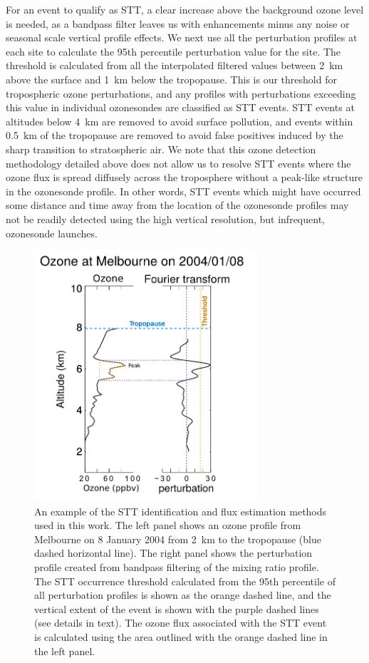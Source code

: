 \documentclass[acp, manuscript]{copernicus} %
\begin{document}
    For an event to qualify as STT, a clear increase above the background ozone level is needed, as a bandpass filter leaves us with enhancements minus any noise or seasonal scale vertical profile effects.
    We next use all the perturbation profiles at each site to calculate the 95th percentile perturbation value for the site.
    The threshold is calculated from all the interpolated filtered values between 2~km above the surface and 1~km below the tropopause.
    This is our threshold for tropospheric ozone perturbations, and any profiles with perturbations exceeding this value in individual ozonesondes are classified as STT events.
    STT events at altitudes below 4~km are removed to avoid surface pollution, and events within 0.5~km of the tropopause are removed to avoid false positives induced by the sharp transition to stratospheric air.
    We note that this ozone detection methodology detailed above does not allow us to resolve STT events where the ozone flux is spread diffusely across the troposphere without a peak-like structure in the ozonesonde profile. 
    In other words, STT events which might have occurred some distance and time away from the location of the ozonesonde profiles may not be readily detected using the high vertical resolution, but infrequent, ozonesonde launches.
    
    \begin{figure}[t]
      \includegraphics[width=8.3cm]{figures/filtereg.png}
      \caption{ %
	An example of the STT identification and flux estimation methods used in this work. 
	The left panel shows an ozone profile from Melbourne on 8 January 2004 from 2~km to the tropopause (blue dashed horizontal line).
	The right panel shows the perturbation profile created from bandpass filtering of the mixing ratio profile. The STT occurrence threshold calculated from the 95th percentile of all perturbation profiles is shown as the orange dashed line, and the vertical extent of the event is shown with the purple dashed lines (see details in text).
	The ozone flux associated with the STT event is calculated using the area outlined with the orange dashed line in the left panel.
      }
      \label{fig:filterEG}
    \end{figure}
   
\end{document}
